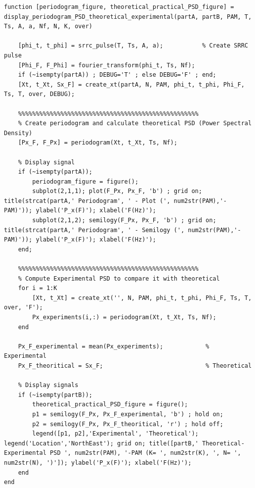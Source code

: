 \documentclass[11pt]{article}
\begin{document}
\begin{lstlisting}[caption = {\texttt{display\_periodogram\_PSD\_theoretical\_experimental.m}}]
function [periodogram_figure, theoretical_practical_PSD_figure] = display_periodogram_PSD_theoretical_experimental(partA, partB, PAM, T, Ts, A, a, Nf, N, K, over)
    
    [phi_t, t_phi] = srrc_pulse(T, Ts, A, a);           % Create SRRC pulse  
    [Phi_F, F_Phi] = fourier_transform(phi_t, Ts, Nf);
    if (~isempty(partA)) ; DEBUG='T' ; else DEBUG='F' ; end;
    [Xt, t_Xt, Sx_F] = create_xt(partA, N, PAM, phi_t, t_phi, Phi_F, Ts, T, over, DEBUG);
    
    %%%%%%%%%%%%%%%%%%%%%%%%%%%%%%%%%%%%%%%%%%%%%%%%%%%
    % Create periodogram and calculate theoretical PSD (Power Spectral Density)
    [Px_F, F_Px] = periodogram(Xt, t_Xt, Ts, Nf);
    
    % Display signal
    if (~isempty(partA)); 
        periodogram_figure = figure();
        subplot(2,1,1); plot(F_Px, Px_F, 'b') ; grid on; title(strcat(partA,' Periodogram', ' - Plot (', num2str(PAM),'-PAM)')); ylabel('P_x(F)'); xlabel('F(Hz)'); 
        subplot(2,1,2); semilogy(F_Px, Px_F, 'b') ; grid on; title(strcat(partA,' Periodogram', ' - Semilogy (', num2str(PAM),'-PAM)')); ylabel('P_x(F)'); xlabel('F(Hz)'); 
    end;
    
    %%%%%%%%%%%%%%%%%%%%%%%%%%%%%%%%%%%%%%%%%%%%%%%%%%%
    % Compute Experimental PSD to compare it with theoretical
    for i = 1:K                                            
        [Xt, t_Xt] = create_xt('', N, PAM, phi_t, t_phi, Phi_F, Ts, T, over, 'F');
        Px_experiments(i,:) = periodogram(Xt, t_Xt, Ts, Nf);
    end
    
    Px_F_experimental = mean(Px_experiments);            % Experimental
    Px_F_theoritical = Sx_F;                        	 % Theoretical
    
    % Display signals
    if (~isempty(partB)); 
        theoretical_practical_PSD_figure = figure();
        p1 = semilogy(F_Px, Px_F_experimental, 'b') ; hold on;
        p2 = semilogy(F_Px, Px_F_theoritical, 'r') ; hold off;
        legend([p1, p2],'Experimental', 'Theoretical'); legend('Location','NorthEast'); grid on; title([partB,' Theoretical-Experimental PSD ', num2str(PAM), '-PAM (K= ', num2str(K), ', N= ', num2str(N), ')']); ylabel('P_x(F)'); xlabel('F(Hz)');
    end
end
\end{lstlisting}
\end{document}
